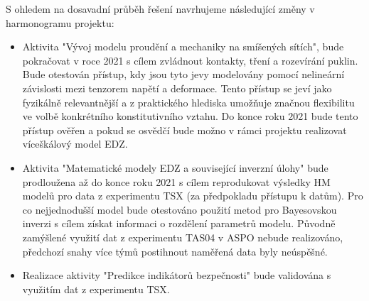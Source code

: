 \documentclass[11pt,a4paper]{article}
\begin{document}
\begin{onehalfspacing}
S ohledem na dosavadní průběh řešení navrhujeme následující změny v harmonogramu projektu:
\begin{itemize}
    \item Aktivita "Vývoj modelu proudění a mechaniky na smíšených sítích", bude pokračovat v roce 2021 s cílem 
zvládnout kontakty, tření a rozevírání puklin. Bude otestován přístup, kdy jsou tyto jevy modelovány pomocí 
nelineární závislosti mezi tenzorem napětí a deformace. Tento přístup se jeví jako fyzikálně relevantnější a z praktického 
hlediska umožňuje značnou flexibilitu ve volbě konkrétního konstitutivního vztahu. Do konce roku 2021 bude tento přístup ověřen
a pokud se osvědčí bude možno v rámci projektu realizovat víceškálový model EDZ.
    \item Aktivita "Matematické modely EDZ a související inverzní úlohy" bude prodloužena až do konce roku 2021 s 
    cílem reprodukovat výsledky HM modelů pro data z experimentu TSX (za předpokladu přístupu k datům). Pro co nejjednodušší 
    model bude otestováno použití metod pro Bayesovskou inverzi s cílem získat informaci o rozdělení parametrů modelu. Původně zamýšlené využití dat z experimentu TAS04 v ASPO nebude realizováno, předchozí snahy více týmů postihnout naměřená data byly neúspěšné.  
    \item Realizace aktivity "Predikce indikátorů bezpečnosti" bude validována s využitím dat z experimentu TSX.
\end{itemize}



%





\end{onehalfspacing}
\end{document}
